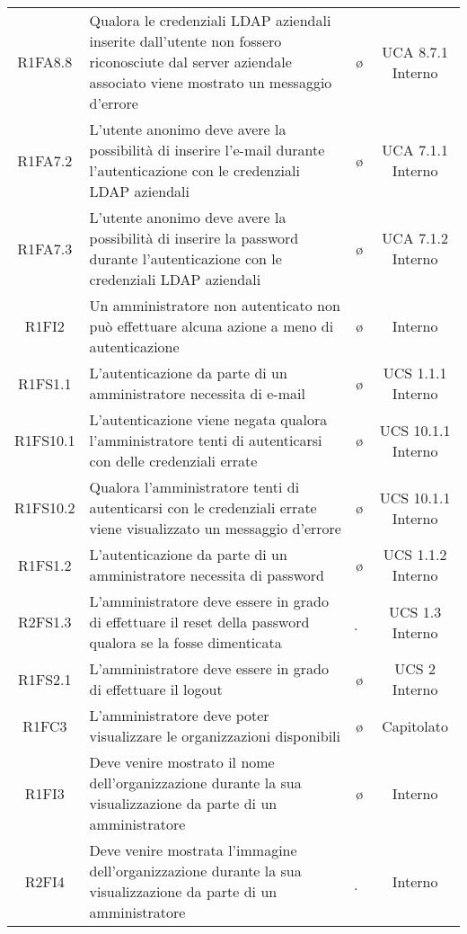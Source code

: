 {\begin{longtable}{ c C{4cm} c c}
R1FA8.8 & Qualora le credenziali LDAP aziendali inserite dall'utente non fossero riconosciute dal server aziendale associato viene mostrato un messaggio d'errore & \o & UCA 8.7.1 Interno \\

R1FA7.2 & L'utente anonimo deve avere la possibilità di inserire l'e-mail durante l'autenticazione con le credenziali LDAP aziendali & \o & UCA 7.1.1 Interno \\

R1FA7.3 & L'utente anonimo deve avere la possibilità di inserire la password durante l'autenticazione con le credenziali LDAP aziendali & \o & UCA 7.1.2 Interno \\

R1FI2 & Un amministratore non autenticato non può effettuare alcuna azione a meno di autenticazione & \o & Interno \\

R1FS1.1 & L’autenticazione da parte di un amministratore necessita di e-mail & \o & UCS 1.1.1 Interno\\

R1FS10.1 & L’autenticazione viene negata qualora l'amministratore tenti di autenticarsi con delle credenziali errate & \o & UCS 10.1.1 Interno \\

R1FS10.2 & Qualora l'amministratore tenti di autenticarsi con le credenziali errate viene visualizzato un messaggio d’errore & \o & UCS 10.1.1 Interno \\

R1FS1.2 & L’autenticazione da parte di un amministratore necessita di password & \o & UCS 1.1.2 Interno\\

R2FS1.3 & L'amministratore deve essere in grado di effettuare il reset della password qualora se la fosse dimenticata & \d & UCS 1.3 Interno\\

R1FS2.1 & L'amministratore deve essere in grado di effettuare il logout & \o & UCS 2 Interno\\

R1FC3 & L'amministratore deve poter visualizzare le organizzazioni disponibili & \o & Capitolato\\

R1FI3 & Deve venire mostrato il nome dell'organizzazione durante la sua visualizzazione da parte di un amministratore & \o & Interno\\

R2FI4 & Deve venire mostrata l'immagine dell'organizzazione durante la sua visualizzazione da parte di un amministratore & \d & Interno\\


\end{longtable}}
